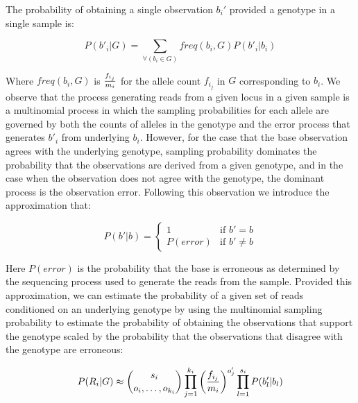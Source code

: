 \documentclass{article}
\begin{document}
The probability of obtaining a single observation $b_i'$ provided a genotype in a single sample is:

\begin{equation}
P(b'_i|G) = \sum_{\forall(b_i \in G)} { freq(b_i,G)P(b'_i|b_i) }
\end{equation}

Where $freq(b_i,G)$ is ${f_{i_j} \over m_i}$ for the allele count $f_{i_j}$ in $G$ corresponding to $b_i$.  We observe that the process generating reads from a given locus in a given sample is a multinomial process in which the sampling probabilities for each allele are governed by both the counts of alleles in the genotype and the error process that generates $b'_i$ from underlying $b_i$.  However, for the case that the base observation agrees with the underlying genotype, sampling probability dominates the probability that the observations are derived from a given genotype, and in the case when the observation does not agree with the genotype, the dominant process is the observation error.  Following this observation we introduce the approximation that:

\begin{equation}
P(b'|b) = 
\left\{
	\begin{array}{ll}
		1 & \mbox{if } b' = b \\
		P(error) & \mbox{if } b' \neq b
	\end{array}
\right.
\end{equation}

Here $P(error)$ is the probability that the base is erroneous as determined by the sequencing process used to generate the reads from the sample.  Provided this approximation, we can estimate the probability of a given set of reads conditioned on an underlying genotype by using the multinomial sampling probability to estimate the probability of obtaining the observations that support the genotype scaled by the probability that the observations that disagree with the genotype are erroneous:

\begin{equation}
P(R_i|G) \approx {s_i \choose o_i,\ldots,o_{k_i} } 
\prod_{j=1}^{k_i} { \left({f_{i_j} \over m_i}\right)^{o'_j} }
\prod_{l=1}^{s_i} { P(b'_l | b_l) }
\end{equation}


\end{document}
